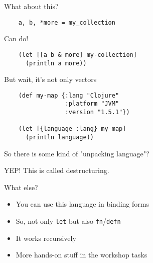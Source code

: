 \begin{frame}[fragile]
  \begin{center}
    What about this?
  \end{center}
  \begin{verbatim}
    a, b, *more = my_collection
  \end{verbatim}
\end{frame}

\begin{frame}[fragile]
  \begin{center}
    Can do!
  \end{center}
  \begin{verbatim}
    (let [[a b & more] my-collection]
      (println a more))
  \end{verbatim}
\end{frame}

\begin{frame}[fragile]
  \begin{center}
    But wait, it's not only vectors
  \end{center}
  \begin{verbatim}
    (def my-map {:lang "Clojure"
                 :platform "JVM"
                 :version "1.5.1"})

    (let [{language :lang} my-map]
      (println language))
  \end{verbatim}
\end{frame}

\begin{frame}
  \begin{center}
    So there is some kind of "unpacking language"?

    \pause
    YEP! This is called destructuring.
  \end{center}
\end{frame}

\begin{frame}
  What else?

  \begin{itemize}
    \item You can use this language in binding forms
    \item So, not only \texttt{let} but also \texttt{fn}/\texttt{defn}
    \item It works recursively
    \item More hands-on stuff in the workshop tasks
  \end{itemize}
\end{frame}


